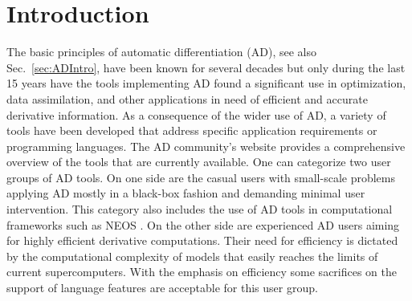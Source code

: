 \documentclass[11pt]{article}
\newcommand{\refsec}[1]{{Sec.~\ref{#1}}}
\begin{document}






\section{Introduction} \label{sec:Introduction}

The basic principles of automatic differentiation (AD), see also \refsec{sec:ADIntro}, 
have been known for several decades \cite{wengert}
but only during the last 15 years have the tools implementing AD found a significant use in 
optimization, data assimilation, and other applications in need of efficient and accurate 
derivative information. 
As a consequence of the wider use of AD, 
a variety of tools have been developed that address specific 
application requirements or programming languages. 
The  AD community's website \cite{autodiffWeb} 
provides a comprehensive overview of the tools that 
are currently available. 
One can categorize two user groups of AD tools. 
On one side are the casual users 
with small-scale problems applying AD mostly in a black-box fashion 
and demanding minimal user intervention. 
This category also includes the use of AD tools in  computational 
frameworks such as NEOS \cite{neosWeb}.
On the other side are experienced AD users aiming for highly efficient 
derivative computations.
Their need for efficiency is dictated by the 
computational complexity of models that easily reaches the limits of  current 
supercomputers. 
With the emphasis on efficiency some sacrifices on the support of 
language features are acceptable for this user group.  
\end{document}
